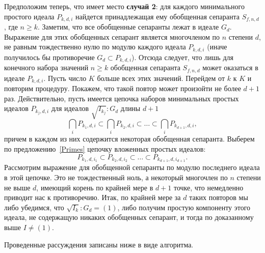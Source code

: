 \documentclass[11pt]{article}
\renewcommand{\ge}{\geqslant}
\theoremstyle{plain}
\theoremstyle{definition}
\theoremstyle{remark}
\begin{document}
\bigskip

Предположим теперь, что имеет место {\bf случай 2}: для каждого минимального простого идеала $P_{k,d,i}$
найдется принадлежащая ему обобщенная сепаранта $S_{f,n,d}$, где $n \ge k$.
Заметим, что все обобщенные сепаранты лежат в идеале $G_d$.
Выражение для этих обобщенных сепарант является многочленом по $n$ степени $d$,
не равным тождественно нулю по модулю каждого идеала $P_{k,d,i}$ (иначе получилось бы противоречие $G_d \subset P_{k,d,i}$).
Отсюда следует, что лишь для конечного набора значений $n \ge k$ обобщенная сепаранта $S_{f,n,d}$ может оказаться в идеале $P_{k,d,i}$.
Пусть число $K$ больше всех этих значений. Перейдем от $k$ к $K$ и повторим процедуру. Покажем, что такой повтор может произойти не более $d+1$ раз. Действительно, пусть имеется цепочка наборов минимальных простых идеалов $P_{k_j, d, i}$ для идеалов $\sqrt{I_{k_j}}:G_d$ длины $d+1$
$$
 \bigcap_i P_{k_1, d, i} \subset \bigcap_i P_{k_2, d, i} \subset \ldots \subset \bigcap_i P_{k_{d+1}, d, i},
$$
причем в каждом из них содержится некоторая обобщенная сепаранта.
Выберем по предложению~\ref{Primes} цепочку вложенных простых идеалов:
$$
 P_{k_1, d, i_1} \subset P_{k_2, d, i_2} \subset \ldots \subset P_{k_{d+1}, d, i_{d+1}}.
$$
Рассмотрим выражение для обобщенной сепаранты по модулю последнего идеала в этой цепочке. Это не тождественный ноль,
а некоторый многочлен по $n$ степени не выше $d$, имеющий корень по крайней мере в $d+1$ точке, что немедленно приводит нас к противоречию.
Итак, по крайней мере за $d$ таких повторов мы либо убедимся, что $\sqrt{I_k}:G_d = (1)$, либо получим простую компоненту этого идеала, не содержащую никаких обобщенных сепарант, и тогда по доказанному выше $I \ne (1)$.

\bigskip

Проведенные рассуждения записаны ниже в виде алгоритма.
\end{document}

